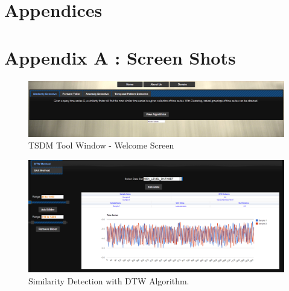 \documentclass[12pt]{report}
\begin{document}
\newpage
\pagestyle{fancy}
\chead{}
\rfoot{\small{\thepage}}
\renewcommand{\headrulewidth}{0.4pt}
\renewcommand{\footrulewidth}{0.4pt}

\section*{Appendices}
\section*{Appendix A : Screen Shots}
\begin{figure}[h!]

  \centering
    \includegraphics[scale=0.35]{./screenshots/welcome_screen.png}
  \caption{TSDM Tool Window - Welcome Screen}
\end{figure}

\begin{figure}[h!]
  
  \centering
    \includegraphics[scale=0.35]{./screenshots/sim_dtw.png}
\caption{Similarity Detection with DTW Algorithm.}
\end{figure}
\end{document}
